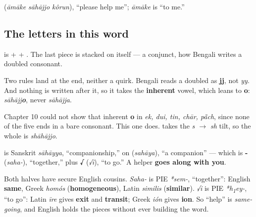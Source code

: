    (\emph{āmāke sāhājjo kôrun}), \textquotedblleft{}please help me\textquotedblright{}; \emph{āmāke} is \textquotedblleft{}to me.\textquotedblright{}

\subsection*{The letters in this word}
\textbf{} is \textbf{} + \textbf{} + \textbf{}. The last piece is \textbf{} stacked on itself — a conjunct, how Bengali writes a doubled consonant.

\begin{sounds}
Two rules land at the end, neither a quirk. Bengali reads a doubled \textbf{} as \textbf{jj}, not \emph{yy}. And nothing is written after it, so it takes the \textbf{inherent} vowel, which leans to \textbf{o}: \emph{sāhājj\textbf{o}}, never \emph{sāhājja}.

Chapter 10 could not show that inherent \textbf{o} in \emph{ek, dui, tin, chār, pā̃ch}, since none of the five ends in a bare consonant. This one does. \textbf{} takes the \emph{s $\to$ sh} tilt, so the whole is \emph{shāhājjo}.
\end{sounds}

\begin{cousinweb}
\textbf{} is Sanskrit \emph{sāhāyya}, \textquotedblleft{}companionship,\textquotedblright{} on \textbf{} (\emph{sahāya}), \textquotedblleft{}a companion\textquotedblright{} — which is \textbf{-} (\emph{saha-}), \textquotedblleft{}together,\textquotedblright{} plus \textbf{√} (\emph{√i}), \textquotedblleft{}to go.\textquotedblright{} A helper \textbf{goes along with you}.

Both halves have secure English cousins. \emph{Saha-} is PIE \emph{*sem-}, \textquotedblleft{}together\textquotedblright{}: English \textbf{same}, Greek \emph{homós} (\textbf{homogeneous}), Latin \emph{similis} (\textbf{similar}). \emph{√i} is PIE \emph{*h\textsubscript{1}ey-}, \textquotedblleft{}to go\textquotedblright{}: Latin \emph{īre} gives \textbf{exit} and \textbf{transit}; Greek \emph{ión} gives \textbf{ion}. So \textquotedblleft{}help\textquotedblright{} is \emph{same-going}, and English holds the pieces without ever building the word.
\end{cousinweb}

